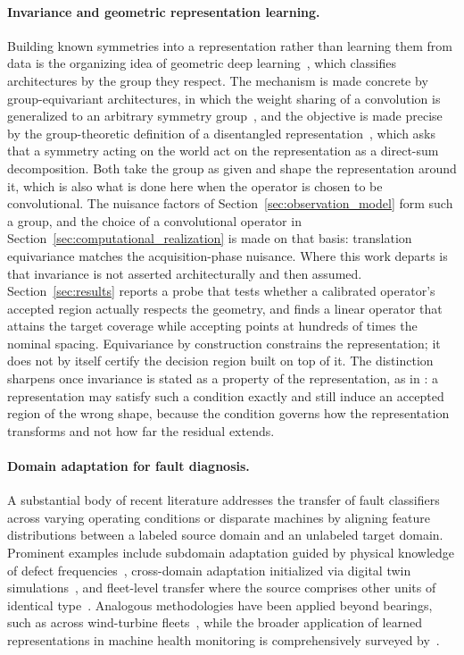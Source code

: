 \documentclass[a4paper]{cas-sc}
\begin{document}
\paragraph{Invariance and geometric representation learning.}
Building known symmetries into a representation rather than learning them from
data is the organizing idea of geometric deep
learning~\citep{bronstein2021}, which classifies architectures by the group
they respect. The mechanism is made concrete by group-equivariant
architectures, in which the weight sharing of a convolution is generalized to
an arbitrary symmetry group~\citep{cohen2016group}, and the objective is made
precise by the group-theoretic definition of a disentangled
representation~\citep{higgins2018}, which asks that a symmetry acting on the
world act on the representation as a direct-sum decomposition. Both take the
group as given and shape the representation around it, which is also what is
done here when the operator is chosen to be convolutional.
The nuisance factors of Section~\ref{sec:observation_model} form
such a group, and the choice of a convolutional operator in
Section~\ref{sec:computational_realization} is made on that basis:
translation equivariance matches the acquisition-phase nuisance. Where this
work departs is that invariance is not asserted architecturally and then
assumed. Section~\ref{sec:results} reports a probe that tests whether a
calibrated operator's accepted region actually respects the geometry, and
finds a linear operator that attains the target coverage while accepting
points at hundreds of times the nominal spacing. Equivariance by construction
constrains the representation; it does not by itself certify the decision
region built on top of it. The distinction sharpens once invariance is stated
as a property of the representation, as in \citet{higgins2018}: a
representation may satisfy such a condition exactly and still induce an
accepted region of the wrong shape, because the condition governs how the
representation transforms and not how far the residual extends.

\paragraph{Domain adaptation for fault diagnosis.}
A substantial body of recent literature addresses the transfer of fault classifiers across varying operating conditions or disparate machines by aligning feature distributions between a labeled source domain and an unlabeled target domain. Prominent examples include subdomain adaptation guided by physical knowledge of defect frequencies~\citep{nguyen2025subdomain}, cross-domain adaptation initialized via digital twin simulations~\citep{ning2026digitaltwin}, and fleet-level transfer where the source comprises other units of identical type~\citep{wang2026fleet}. Analogous methodologies have been applied beyond bearings, such as across wind-turbine fleets~\citep{roelofs2024transfer}, while the broader application of learned representations in machine health monitoring is comprehensively surveyed by~\citet{zhao2019}.
\end{document}
